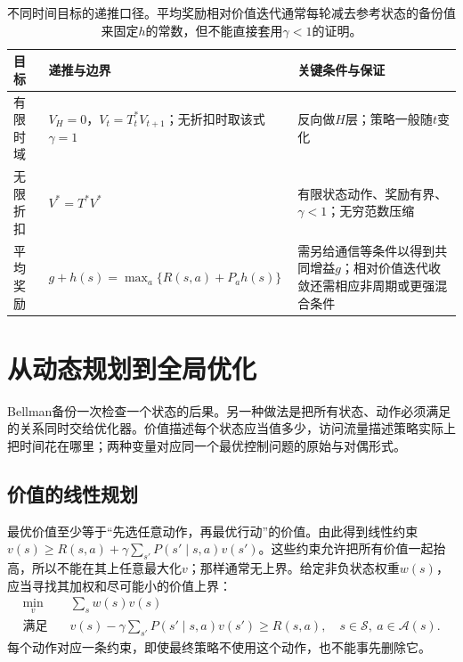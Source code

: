 \begin{table}[htbp]
 \centering
 \small
 \begin{tabularx}{\linewidth}{@{}l>{\raggedright\arraybackslash}X>{\raggedright\arraybackslash}X@{}}
  \toprule
  目标 & 递推与边界 & 关键条件与保证\\
  \midrule
  有限时域 & $V_H=0$，$V_t=T_t^*V_{t+1}$；无折扣时取该式$\gamma=1$ & 反向做$H$层；策略一般随$t$变化\\
  无限折扣 & $V^*=T^*V^*$ & 有限状态动作、奖励有界、$\gamma<1$；无穷范数压缩\\
  平均奖励 & $g+h(s)=\max_a\{R(s,a)+P_ah(s)\}$ & 需另给通信等条件以得到共同增益$g$；相对价值迭代收敛还需相应非周期或更强混合条件\\
  \bottomrule
 \end{tabularx}
 \caption{不同时间目标的递推口径。平均奖励相对价值迭代通常每轮减去参考状态的备份值来固定$h$的常数，但不能直接套用$\gamma<1$的证明。}
 \label{tab:rl-planning-horizons}
\end{table}

\section{从动态规划到全局优化}
\label{sec:rl-planning-linear-programming}

Bellman备份一次检查一个状态的后果。另一种做法是把所有状态、动作必须满足的关系同时交给优化器。价值描述每个状态应当值多少，访问流量描述策略实际上把时间花在哪里；两种变量对应同一个最优控制问题的原始与对偶形式。

\subsection{价值的线性规划}
\label{sec:rl-planning-value-lp}

最优价值至少等于“先选任意动作，再最优行动”的价值。由此得到线性约束
$v(s)\geq R(s,a)+\gamma\sum_{s'}P(s'\mid s,a)v(s')$。这些约束允许把所有价值一起抬高，所以不能在其上任意最大化$v$；那样通常无上界。给定非负状态权重$w(s)$，应当寻找其加权和尽可能小的价值上界：
\begin{equation}
 \begin{aligned}
 \min_v\quad &\sum_s w(s)v(s)\\
 \text{满足}\quad
 &v(s)-\gamma\sum_{s'}P(s'\mid s,a)v(s')\geq R(s,a),
 \quad s\in\mathcal S,\ a\in\mathcal A(s).
 \end{aligned}
 \label{eq:rl-planning-value-lp}
\end{equation}
每个动作对应一条约束，即使最终策略不使用这个动作，也不能事先删除它。

